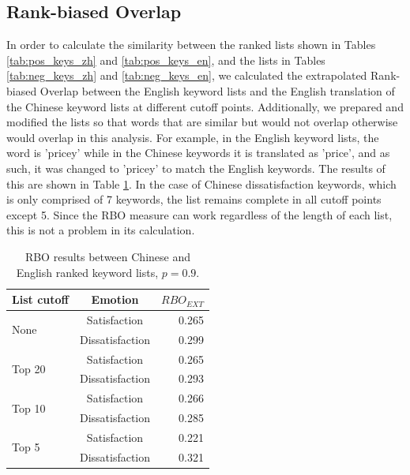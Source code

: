 \subsection{Rank-biased Overlap}\label{rboresults}

In order to calculate the similarity between the ranked lists shown in Tables \ref{tab:pos_keys_zh} and \ref{tab:pos_keys_en}, and the lists in Tables \ref{tab:neg_keys_zh} and \ref{tab:neg_keys_en}, we calculated the extrapolated Rank-biased Overlap between the English keyword lists and the English translation of the Chinese keyword lists at different cutoff points. Additionally, we prepared and modified the lists so that words that are similar but would not overlap otherwise would overlap in this analysis. For example, in the English keyword lists, the word is 'pricey' while in the Chinese keywords it is translated as 'price', and as such, it was changed to 'pricey' to match the English keywords. The results of this are shown in Table \ref{tab:rbo}. In the case of Chinese dissatisfaction keywords, which is only comprised of 7 keywords, the list remains complete in all cutoff points except 5. Since the RBO measure can work regardless of the length of each list, this is not a problem in its calculation.

\begin{table}[hbp]
\centering
\caption{RBO results between Chinese and English ranked keyword lists, \(p=0.9\).}
\label{tab:rbo}
\begin{tabular}{|l|c|r|}
\hline
\multicolumn{1}{|c|}{\textbf{List cutoff}} & \textbf{Emotion} & \(RBO_{EXT}\) \\ \hline
\multirow{2}{*}{None}   & Satisfaction      & 0.265 \\ \cline{2-3} 
                        & Dissatisfaction   & 0.299 \\ \hline
\multirow{2}{*}{Top 20} & Satisfaction      & 0.265 \\ \cline{2-3} 
                        & Dissatisfaction   & 0.293 \\ \hline
\multirow{2}{*}{Top 10} & Satisfaction      & 0.266 \\ \cline{2-3} 
                        & Dissatisfaction   & 0.285 \\ \hline
\multirow{2}{*}{Top 5}  & Satisfaction      & 0.221 \\ \cline{2-3} 
                        & Dissatisfaction   & 0.321 \\ \hline
\end{tabular}
\end{table}

